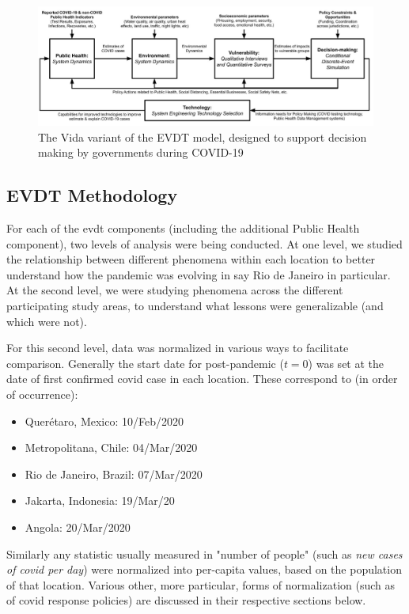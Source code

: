 \begin{figure}[!htb]
	\centering
	\includegraphics[scale=0.25]{Figures/chap5/Vida_Flowchart_v2.jpg}
	\caption[The Vida Variant of the EVDT Model]{The Vida variant of the EVDT model, designed to support decision making by governments during COVID-19}
	\label{fig:vida_flow}
\end{figure}

\subsection{EVDT Methodology} \label{sec:vida-evdt-method}

For each of the \ac{evdt} components (including the additional Public Health component), two levels of analysis were being conducted. At one level, we studied the relationship between different phenomena within each location to better understand how the pandemic was evolving in say Rio de Janeiro in particular. At the second level, we were studying phenomena across the different participating study areas, to understand what lessons were generalizable (and which were not). 

For this second level, data was normalized in various ways to facilitate comparison. Generally the start date for post-pandemic ($t=0$) was set at the date of first confirmed \ac{covid} case in each location. These correspond to (in order of occurrence):

 \begin{itemize}[itemsep=0pt,parsep=0pt]
	\item{Querétaro, Mexico: 10/Feb/2020}
	\item{Metropolitana, Chile: 04/Mar/2020}
	\item{Rio de Janeiro, Brazil: 07/Mar/2020}
	\item{Jakarta, Indonesia: 19/Mar/20}
	\item{Angola: 20/Mar/2020}
\end{itemize}

Similarly any statistic usually measured in "number of people" (such as \textit{new cases of \ac{covid} per day}) were normalized into per-capita values, based on the population of that location. Various other, more particular, forms of normalization (such as of \ac{covid} response policies) are discussed in their respective sections below.

